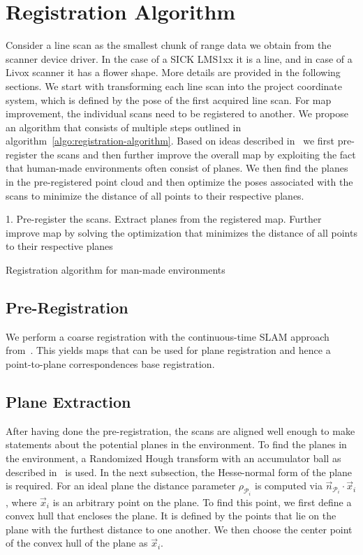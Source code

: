 \section{Registration Algorithm}

Consider a line scan as the smallest chunk of range data we obtain from the scanner device driver.
In the case of a SICK LMS1xx it is a line, and in case of a Livox scanner it has a flower shape.
More details are provided in the following sections.
We start with transforming each line scan into the project coordinate system, which is defined by the pose of the first acquired line scan.
%
For map improvement, the individual scans need to be registered to another. 
We propose an algorithm that consists of multiple steps outlined in algorithm~\ref{algo:registration-algorithm}. 
Based on ideas described in~\cite{Borrmann2010} we first pre-register the scans and then further improve the overall map by exploiting the fact that human-made environments often consist of planes. 
We then find the planes in the pre-registered point cloud and then optimize the poses associated with the scans to minimize the distance of all points to their respective planes. 

\begin{algorithm}
    \SetAlgoLined
    1. Pre-register the scans. Extract planes from the registered map. Further improve map by solving the optimization that minimizes the distance of all points to their respective planes\;
    \caption{Registration algorithm for man-made environments}
    \label{algo:registration-algorithm}
\end{algorithm}

\subsection{Pre-Registration}

We perform a coarse registration with the continuous-time SLAM approach from~\cite{REMSEN2013}.
This yields maps that can be used for plane registration and hence a point-to-plane correspondences base registration.

\subsection{Plane Extraction}

After having done the pre-registration, the scans are aligned well enough to make statements about the potential planes in the environment.
To find the planes in the environment, a Randomized Hough transform with an accumulator ball as described in~\cite{3DRESEARCH2011} is used. 
In the next subsection, the Hesse-normal form of the plane is required.
For an ideal plane the distance parameter $\rho_{\mathcal{P}_i}$ is computed via $\vec{n}_{\mathcal{P}_i}\cdot\vec{x}_i$, where $\vec{x}_i$ is an arbitrary point on the plane.
To find this point, we first define a convex hull that encloses the plane.
It is defined by the points that lie on the plane with the furthest distance to one another.
We then choose the center point of the convex hull of the plane as $\vec{x}_i$.

